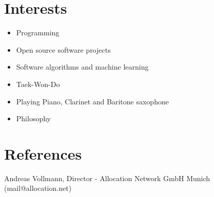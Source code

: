 \documentclass[11pt,a4paper]{article}
\begin{document}
\section*{Interests}
\begin{itemize}
	\setlength{\itemsep}{1pt}
	\item Programming
	\item Open source software projects
	\item Software algorithms and machine learning
	\item Taek-Won-Do
	\item Playing Piano, Clarinet and Baritone saxophone
	\item Philosophy
\end{itemize}

\section*{References}
Andreas Vollmann, Director - Allocation Network GmbH Munich (mail@allocation.net)
\end{document}
